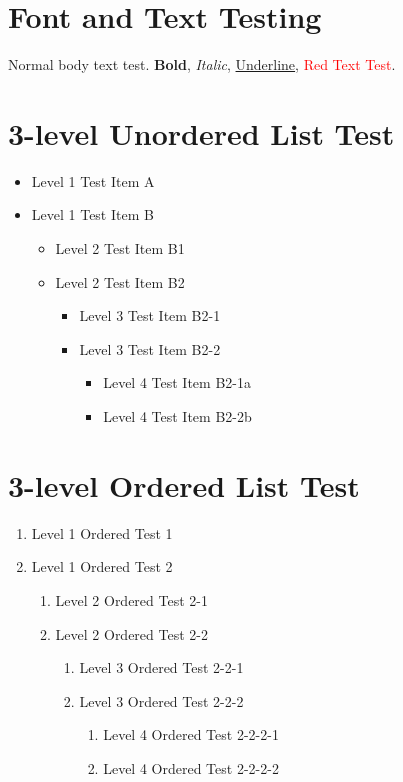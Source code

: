 \section{Font and Text Testing}
Normal body text test. \textbf{Bold}, \textit{Italic}, \underline{Underline}, \textcolor{red}{Red Text Test}.

\section{3-level Unordered List Test}
\begin{itemize}
\item Level 1 Test Item A
\item Level 1 Test Item B
    \begin{itemize}
    \item Level 2 Test Item B1
    \item Level 2 Test Item B2
        \begin{itemize}
        \item Level 3 Test Item B2-1
        \item Level 3 Test Item B2-2
            \begin{itemize}
            \item Level 4 Test Item B2-1a
            \item Level 4 Test Item B2-2b
            \end{itemize}
        \end{itemize}
    \end{itemize}
\end{itemize}

\section{3-level Ordered List Test}
\begin{enumerate}
\item Level 1 Ordered Test 1
\item Level 1 Ordered Test 2
    \begin{enumerate}
    \item Level 2 Ordered Test 2-1
    \item Level 2 Ordered Test 2-2
        \begin{enumerate}
        \item Level 3 Ordered Test 2-2-1
        \item Level 3 Ordered Test 2-2-2
            \begin{enumerate}
            \item Level 4 Ordered Test 2-2-2-1
            \item Level 4 Ordered Test 2-2-2-2
            \end{enumerate}
        \end{enumerate}
    \end{enumerate}
\end{enumerate}

